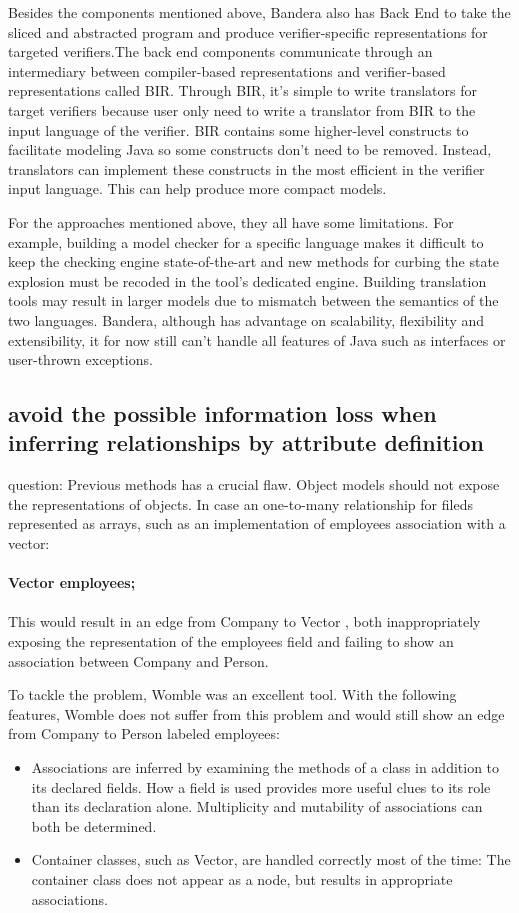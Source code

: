 \documentclass[acmsmall]{acmart}
\begin{document}
Besides the components mentioned above, Bandera also has Back End to take the sliced and abstracted program and produce verifier-specific representations for targeted verifiers.The back end components communicate through an intermediary between compiler-based representations and 
verifier-based representations called BIR. Through BIR, it's simple to  write translators for target verifiers because user only need to write a translator from BIR to the input language of the verifier. BIR contains some higher-level constructs to facilitate modeling Java so some constructs don't need to be removed. Instead, translators can implement these constructs in the most efficient in the verifier input language. This can help produce more compact models.


For the approaches mentioned above, they all have some limitations. For example, building a model checker for a specific language makes it difficult to keep the checking engine state-of-the-art and new methods for curbing the state explosion must be recoded in the tool’s dedicated engine\cite{corbett2000bandera}. Building translation tools may result in larger models due to mismatch between the semantics of the two languages. Bandera, although has advantage on scalability, flexibility and extensibility, it for now still can't handle all features of Java such as  interfaces or user-thrown exceptions.

\subsection{avoid the possible information loss when inferring relationships by attribute definition}
question:  Previous methods has a crucial flaw.  Object models should not expose the representations of objects.
In case an one-to-many relationship for fileds represented as arrays, such as
an implementation of employees association with a vector:
\\
\\
\textbf{Vector employees;}
\\
\\This would result in an edge from Company to Vector , both
inappropriately exposing the representation of the
employees field and failing to show an association between
Company and Person.


To tackle the problem, Womble was an excellent tool\cite{2001Lightweight}.
With the following features, Womble does not suffer from this problem and
would still show an edge from Company to Person labeled
employees:
\begin{itemize}
    \item Associations are inferred by examining the methods
    of a class in addition to its declared fields. How a
    field is used provides more useful clues to its role
    than its declaration alone. Multiplicity and mutability of associations can both be determined.
    \item Container classes, such as Vector, are handled
    correctly most of the time: The container class does
    not appear as a node, but results in appropriate associations.
\end{itemize}
\end{document}
